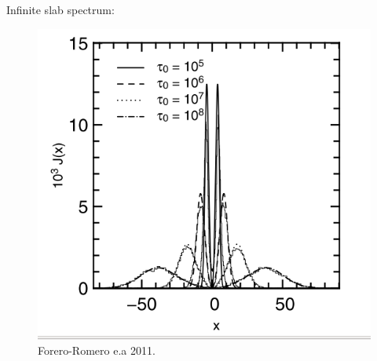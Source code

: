 \documentclass{beamer}
\begin{document}
\begin{frame}{Infinite slab spectrum:}
\begin{figure}
\includegraphics[scale=0.4]{Figures/slab.png}
\caption*{Forero-Romero e.a 2011.}
\end{figure}
\end{frame}
\end{document}
